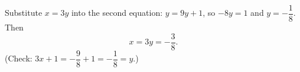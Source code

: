 Substitute $x=3y$ into the second equation: $y=9y+1$, so $-8y=1$ and $y=-\dfrac{1}{8}$. Then
\[x=3y=\boxed{-\dfrac{3}{8}}.\]
(Check: $3x+1=-\dfrac{9}{8}+1=-\dfrac{1}{8}=y$.)
